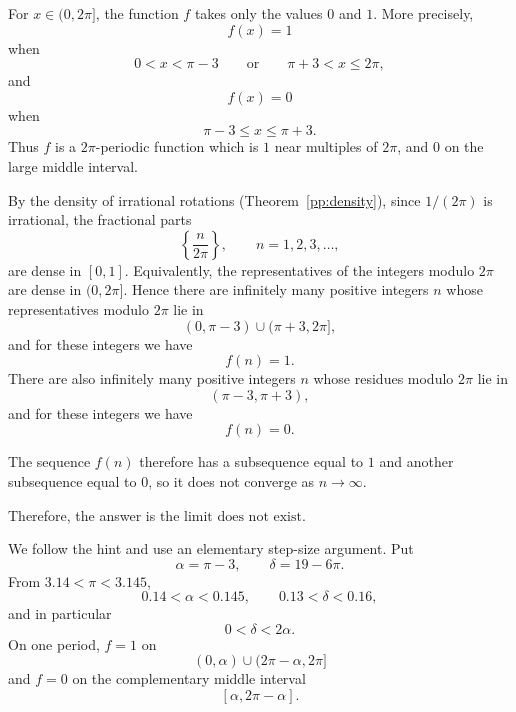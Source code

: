     \begin{solutions}
        \begin{solution}
            For $x\in(0,2\pi]$, the function $f$ takes only the values $0$ and $1$. More precisely,
            \[
                f(x)=1
            \]
            when
            \[
                0<x<\pi-3
                \qquad\text{or}\qquad
                \pi+3<x\leq 2\pi,
            \]
            and
            \[
                f(x)=0
            \]
            when
            \[
                \pi-3\leq x\leq \pi+3.
            \]
            Thus $f$ is a $2\pi$-periodic function which is $1$ near multiples of $2\pi$, and
            $0$ on the large middle interval.

            By the density of irrational rotations (Theorem~\ref{pp:density}), since
            $1/(2\pi)$ is irrational, the fractional parts
            \[
                \left\{\frac{n}{2\pi}\right\},
                \qquad n=1,2,3,\dots,
            \]
            are dense in $[0,1]$. Equivalently, the representatives of the integers
            modulo $2\pi$ are dense in $(0,2\pi]$. Hence there are infinitely many
            positive integers $n$ whose representatives modulo $2\pi$ lie in
            \[
                (0,\pi-3)\cup(\pi+3,2\pi],
            \]
            and for these integers we have
            \[
                f(n)=1.
            \]
            There are also infinitely many positive integers $n$ whose residues modulo $2\pi$ lie in
            \[
                (\pi-3,\pi+3),
            \]
            and for these integers we have
            \[
                f(n)=0.
            \]

            The sequence $f(n)$ therefore has a subsequence equal to $1$ and another
            subsequence equal to $0$, so it does not converge as $n\to\infty$.

            Therefore, the answer is $\boxed{\text{the limit does not exist}}$.
        \end{solution}

        \begin{solution}
            We follow the hint and use an elementary step-size argument. Put
            \[
                \alpha=\pi-3,
                \qquad
                \delta=19-6\pi.
            \]
            From $3.14<\pi<3.145$,
            \[
                0.14<\alpha<0.145,
                \qquad
                0.13<\delta<0.16,
            \]
            and in particular
            \[
                0<\delta<2\alpha.
            \]
            On one period, $f=1$ on
            \[
                (0,\alpha)\cup(2\pi-\alpha,2\pi]
            \]
            and $f=0$ on the complementary middle interval
            \[
                [\alpha,2\pi-\alpha].
            \]


\end{solution}
\end{solutions}
